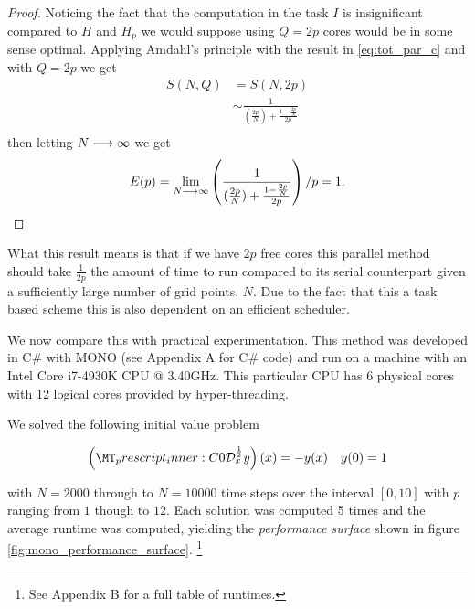 \begin{proof}
Noticing the fact that the computation in the task $ I $ is insignificant compared to $ H $ and $ H_p $ we would suppose using $ Q = 2p $ cores would be in some sense optimal. Applying Amdahl's principle with the result in \ref{eq:tot_par_c} and with $ Q = 2p $ we get 
\begin{align}
    S(N, Q) &= S(N, 2p) \\
    &\sim \frac{1}{(\frac{2p}{N}) + \frac{1-\frac{2p}{N}}{2p} } \\
\end{align}
then letting $ N \longrightarrow \infty $ we get
\begin{align}
    E(p) = \lim_{N \longrightarrow \infty} \left(\frac{1}{(\frac{2p}{N}) + \frac{1-\frac{2p}{N}}{2p} } \right) \slash p = 1.
\end{align}

\end{proof}

What this result means is that if we have $ 2p $ free cores this parallel method should take $ \frac{1}{2p} $ the amount of time to run compared to its serial counterpart given a sufficiently large number of grid points, $N$. Due to the fact that this a task based scheme this is also dependent on an efficient scheduler.

We now compare this with practical experimentation. This method was developed in C\# with MONO (see Appendix A for C\# code) and run on a machine with an Intel \textregistered Core \texttrademark{} i7-4930K CPU @ 3.40GHz. This particular CPU has 6 physical cores with 12 logical cores provided by hyper-threading. 

We solved the following initial value problem

\begin{align}
    \capder{0}{x}{\frac{1}{2}}{y}(x) = -y(x) & & y(0) = 1
\end{align}

with $ N = 2000 $ through to $ N = 10000 $ time steps over the interval $ [0,10] $ with $ p $ ranging from $ 1 $ though to $ 12 $. Each solution was computed 5 times and the average runtime  was computed, yielding the \emph{performance surface} shown in figure \ref{fig:mono_performance_surface}. \footnote{See Appendix B for a full table of runtimes.}

